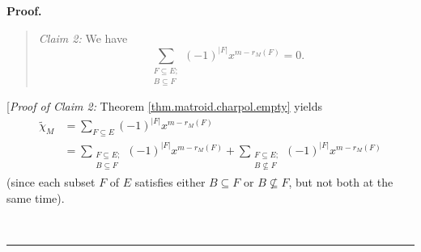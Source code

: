 \documentclass[numbers=enddot,12pt,final,onecolumn,notitlepage]{scrartcl}%
\theoremstyle{definition}
\newenvironment{statement}{\begin{quote}}{\end{quote}}
\newenvironment{proof}[1][Proof]{\noindent\textbf{#1.} }{\ \rule{0.5em}{0.5em}}
\newenvironment{verlong}{}{}
\let\sumnonlimits\sum
\renewcommand{\sum}{\sumnonlimits\limits}
\begin{document}
\begin{verlong}
\begin{proof}
\begin{statement}
\textit{Claim 2:} We have
\begin{equation}
\sum_{\substack{F\subseteq E;\\B\subseteq F}}\left(  -1\right)  ^{\left\vert
F\right\vert }x^{m-r_{M}\left(  F\right)  }=0.
\label{pf.thm.dahwil.matroid.0=}%
\end{equation}

\end{statement}

[\textit{Proof of Claim 2:} Theorem \ref{thm.matroid.charpol.empty} yields%
\begin{align}
\widetilde{\chi}_{M}  &  =\sum_{F\subseteq E}\left(  -1\right)  ^{\left\vert
F\right\vert }x^{m-r_{M}\left(  F\right)  }\nonumber\\
&  =\sum_{\substack{F\subseteq E;\\B\subseteq F}}\left(  -1\right)
^{\left\vert F\right\vert }x^{m-r_{M}\left(  F\right)  }+\sum
_{\substack{F\subseteq E;\\B\not \subseteq F}}\left(  -1\right)  ^{\left\vert
F\right\vert }x^{m-r_{M}\left(  F\right)  }
\label{pf.thm.dahwil.matroid.XiG.c2.pf.2}%
\end{align}
(since each subset $F$ of $E$ satisfies either $B\subseteq F$ or
$B\not \subseteq F$, but not both at the same time).


\end{proof}
\end{verlong}
\end{document}
